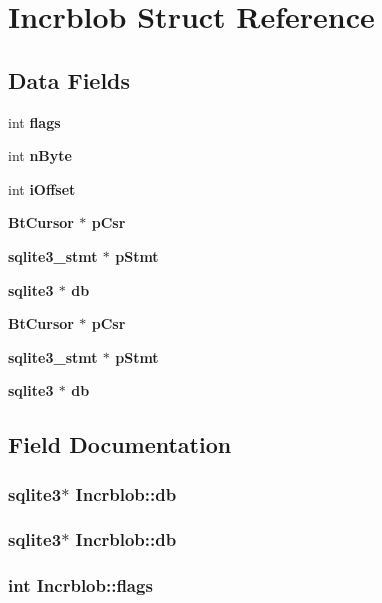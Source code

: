 \section{Incrblob Struct Reference}
\label{structIncrblob}
\subsection*{Data Fields}
\begin{CompactItemize}
\item 
int \bf{flags}
\item 
int \bf{n\-Byte}
\item 
int \bf{i\-Offset}
\item 
\bf{Bt\-Cursor} $\ast$ \bf{p\-Csr}
\item 
\bf{sqlite3\_\-stmt} $\ast$ \bf{p\-Stmt}
\item 
\bf{sqlite3} $\ast$ \bf{db}
\item 
\bf{Bt\-Cursor} $\ast$ \bf{p\-Csr}
\item 
\bf{sqlite3\_\-stmt} $\ast$ \bf{p\-Stmt}
\item 
\bf{sqlite3} $\ast$ \bf{db}
\end{CompactItemize}


\subsection{Field Documentation}
\subsubsection{\setlength{\rightskip}{0pt plus 5cm}\bf{sqlite3}$\ast$ \bf{Incrblob::db}}\label{structIncrblob_a91bc84985cbe1f28739daad8b48b3da}


\subsubsection{\setlength{\rightskip}{0pt plus 5cm}\bf{sqlite3}$\ast$ \bf{Incrblob::db}}\label{structIncrblob_a91bc84985cbe1f28739daad8b48b3da}


\subsubsection{\setlength{\rightskip}{0pt plus 5cm}int \bf{Incrblob::flags}}\label{structIncrblob_0d18c548841a46cbcefe8675f2b517ed}


